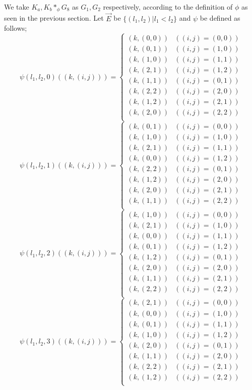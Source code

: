\documentclass[conference]{IEEEtran}
\begin{document}
We take $K_a, K_b *_\phi G_8$ as $G_1, G_2$ respectively, according to the definition of $\phi$ as seen in the previous section.
Let $\vec{E}$ be $\{(l_1,l_2)| l_1 < l_2\}$ and $\psi$ be defined as follows;
\[
  \psi(l_1,l_2,0)((k,(i,j))) =
    \begin{cases}
      (k,(0,0)) & ((i,j)=(0,0))\\
      (k,(0,1)) & ((i,j)=(1,0))\\
      (k,(1,0)) & ((i,j)=(1,1))\\
      (k,(2,1)) & ((i,j)=(1,2))\\

      (k,(1,1)) & ((i,j)=(0,1))\\
      (k,(2,2)) & ((i,j)=(2,0))\\
      (k,(1,2)) & ((i,j)=(2,1))\\
      (k,(2,0)) & ((i,j)=(2,2))\\
    \end{cases}
\]
\[
  \psi(l_1,l_2,1)((k,(i,j))) =
    \begin{cases}
      (k,(0,1)) & ((i,j)=(0,0))\\
      (k,(1,0)) & ((i,j)=(1,0))\\
      (k,(2,1)) & ((i,j)=(1,1))\\
      (k,(0,0)) & ((i,j)=(1,2))\\

      (k,(2,2)) & ((i,j)=(0,1))\\
      (k,(1,2)) & ((i,j)=(2,0))\\
      (k,(2,0)) & ((i,j)=(2,1))\\
      (k,(1,1)) & ((i,j)=(2,2))\\
    \end{cases}
\]
\[
  \psi(l_1,l_2,2)((k,(i,j))) =
    \begin{cases}
      (k,(1,0)) & ((i,j)=(0,0))\\
      (k,(2,1)) & ((i,j)=(1,0))\\
      (k,(0,0)) & ((i,j)=(1,1))\\
      (k,(0,1)) & ((i,j)=(1,2))\\

      (k,(1,2)) & ((i,j)=(0,1))\\
      (k,(2,0)) & ((i,j)=(2,0))\\
      (k,(1,1)) & ((i,j)=(2,1))\\
      (k,(2,2)) & ((i,j)=(2,2))\\
    \end{cases}
\]
\[
  \psi(l_1,l_2,3)((k,(i,j))) =
    \begin{cases}
      (k,(2,1)) & ((i,j)=(0,0))\\
      (k,(0,0)) & ((i,j)=(1,0))\\
      (k,(0,1)) & ((i,j)=(1,1))\\
      (k,(1,0)) & ((i,j)=(1,2))\\

      (k,(2,0)) & ((i,j)=(0,1))\\
      (k,(1,1)) & ((i,j)=(2,0))\\
      (k,(2,2)) & ((i,j)=(2,1))\\
      (k,(1,2)) & ((i,j)=(2,2))\\
    \end{cases}
\]
\end{document}
